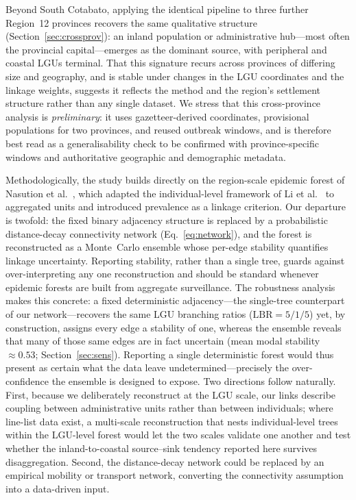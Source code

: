 \documentclass[a4paper,11pt]{article}
\begin{document}
Beyond South Cotabato, applying the identical pipeline to three further Region~12
provinces recovers the same qualitative structure (Section~\ref{sec:crossprov}): an
inland population or administrative hub---most often the provincial capital---emerges
as the dominant source, with peripheral and coastal LGUs terminal. That this
signature recurs across provinces of differing size and geography, and is stable
under changes in the LGU coordinates and the linkage weights, suggests it reflects
the method and the region's settlement structure rather than any single dataset. We
stress that this cross-province analysis is \emph{preliminary}: it uses
gazetteer-derived coordinates, provisional populations for two provinces, and reused
outbreak windows, and is therefore best read as a generalisability check to be
confirmed with province-specific windows and authoritative geographic and
demographic metadata.

Methodologically, the study builds directly on the region-scale epidemic forest of
Nasution et al.\ \cite{Nasution2024}, which adapted the individual-level framework
of Li et al.\ \cite{Li2019} to aggregated units and introduced prevalence as a
linkage criterion. Our departure is twofold: the fixed binary adjacency structure
is replaced by a probabilistic distance-decay connectivity network
(Eq.~\ref{eq:network}), and the forest is reconstructed as a Monte~Carlo ensemble
whose per-edge stability quantifies linkage uncertainty. Reporting stability,
rather than a single tree, guards against over-interpreting any one reconstruction
and should be standard whenever epidemic forests are built from aggregate
surveillance. The robustness analysis makes this concrete: a fixed deterministic
adjacency---the single-tree counterpart of our network---recovers the same
LGU branching ratios ($\mathrm{LBR}=5/1/5$) yet, by construction, assigns every edge a stability
of one, whereas the ensemble reveals that many of those same edges are in fact
uncertain (mean modal stability $\approx0.53$; Section~\ref{sec:sens}). Reporting a
single deterministic forest would thus present as certain what the data leave
undetermined---precisely the over-confidence the ensemble is designed to expose. Two directions follow naturally. First, because we deliberately
reconstruct at the LGU scale, our links describe coupling between administrative
units rather than between individuals; where line-list data exist, a multi-scale
reconstruction that nests individual-level trees within the LGU-level forest
\cite{LiShi2020} would let the two scales validate one another and test whether the inland-to-coastal
source--sink tendency reported here survives disaggregation. Second, the distance-decay network
could be replaced by an empirical mobility or transport network, converting the
connectivity assumption into a data-driven input.
\end{document}
